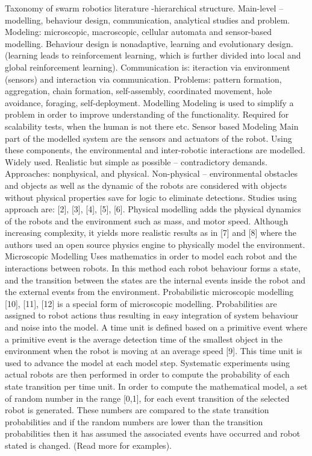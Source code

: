 Taxonomy of swarm robotics literature -hierarchical structure. Main-level – modelling, behaviour design, communication, analytical studies and problem. Modeling: microscopic, macroscopic, cellular automata and sensor-based modelling. Behaviour design is nonadaptive, learning and evolutionary design. (learning leads to reinforcement learning, which is further divided into local and global reinforcement learning). Communication is: iteraction via environment (sensors) and interaction via communication. Problems: pattern formation, aggregation, chain formation, self-assembly, coordinated movement, hole avoidance, foraging, self-deployment. 
Modelling
 Modeling is used to simplify a problem in order to improve understanding of the functionality. Required for scalability tests, when the human is not there etc. 
Sensor based Modeling
Main part of the modelled system are the sensors and actuators of the robot. Using these components, the environmental and inter-robotic interactions are modelled. Widely used. Realistic but simple as possible – contradictory demands. 
Approaches: nonphysical, and physical. Non-physical – environmental obstacles and objects as well as the dynamic of the robots are considered with objects without physical properties save for logic to eliminate detections. Studies using approach are:  [2], [3], [4], [5], [6]. Physical modelling adds the physical dynamics of the robots and the environment such as mass, and motor speed. Although increasing complexity, it yields more realistic results as in [7] and [8] where the authors used an open source physics engine to physically model the environment. 
Microscopic Modelling
Uses mathematics in order to model each robot and the interactions between robots. In this method each robot behaviour forms a state, and the transition between the states are the internal events inside the robot and the external events from the environment. Probabilistic microscopic modelling [10], [11], [12] is a special form of microscopic modelling. Probabilities are assigned to robot actions thus resulting in easy integration of system behaviour and noise into the model. A time unit is defined based on a primitive event where a primitive event is the average detection time of the smallest object in the environment when the robot is moving at an average speed [9]. This time unit is used to advance the model at each model step. Systematic experiments using actual robots are then performed in order to compute the probability of each state transition per time unit. In order to compute the mathematical model, a set of random number in the range [0,1], for each event transition of the selected robot is generated. These numbers are compared to the state transition probabilities and if the random numbers are lower than the transition probabilities then it has assumed the associated events have occurred and robot stated is changed. (Read more for examples). 

